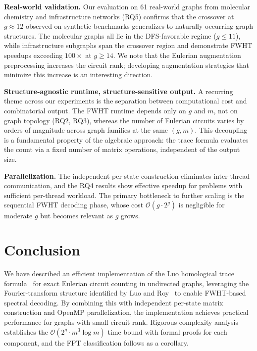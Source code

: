 \documentclass[acmsmall,review]{acmart}
\newcommand{\bigO}{\mathcal{O}}
\begin{document}
	\textbf{Real-world validation.} Our evaluation on 61 real-world graphs from molecular chemistry and infrastructure networks (RQ5) confirms that the crossover at $g \approx 12$ observed on synthetic benchmarks generalizes to naturally occurring graph structures. The molecular graphs all lie in the DFS-favorable regime ($g \le 11$), while infrastructure subgraphs span the crossover region and demonstrate FWHT speedups exceeding $100\times$ at $g \ge 14$. We note that the Eulerian augmentation preprocessing increases the circuit rank; developing augmentation strategies that minimize this increase is an interesting direction.
	
	\textbf{Structure-agnostic runtime, structure-sensitive output.} A recurring theme across our experiments is the separation between computational cost and combinatorial output. The FWHT runtime depends only on $g$ and $m$, not on graph topology (RQ2, RQ3), whereas the number of Eulerian circuits varies by orders of magnitude across graph families at the same $(g, m)$. This decoupling is a fundamental property of the algebraic approach: the trace formula evaluates the count via a fixed number of matrix operations, independent of the output size.
	
	\textbf{Parallelization.} The independent per-state construction eliminates inter-thread communication, and the RQ4 results show effective speedup for problems with sufficient per-thread workload. The primary bottleneck to further scaling is the sequential FWHT decoding phase, whose cost $\bigO(g \cdot 2^g)$ is negligible for moderate $g$ but becomes relevant as $g$ grows.
	
	\section{Conclusion}
	\label{sec:conclusion}
	We have described an efficient implementation of the Luo homological trace formula~\cite{Luo2025} for exact Eulerian circuit counting in undirected graphs, leveraging the Fourier-transform structure identified by Luo and Roy~\cite{LR24} to enable FWHT-based spectral decoding. By combining this with independent per-state matrix construction and OpenMP parallelization, the implementation achieves practical performance for graphs with small circuit rank. Rigorous complexity analysis establishes the $\bigO(2^g \cdot m^3 \log m)$ time bound with formal proofs for each component, and the FPT classification follows as a corollary.
	
\end{document}
